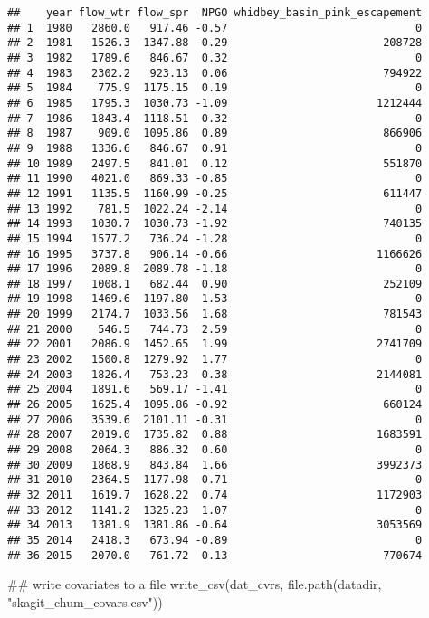 \documentclass[11pt,]{article}
\newenvironment{Shaded}{}{}
\newcommand{\KeywordTok}[1]{\textcolor[rgb]{0.00,0.00,1.00}{#1}}
\newcommand{\StringTok}[1]{\textcolor[rgb]{0.00,0.50,0.50}{#1}}
\newcommand{\NormalTok}[1]{#1}
\begin{document}
\begin{verbatim}
##    year flow_wtr flow_spr  NPGO whidbey_basin_pink_escapement
## 1  1980   2860.0   917.46 -0.57                             0
## 2  1981   1526.3  1347.88 -0.29                        208728
## 3  1982   1789.6   846.67  0.32                             0
## 4  1983   2302.2   923.13  0.06                        794922
## 5  1984    775.9  1175.15  0.19                             0
## 6  1985   1795.3  1030.73 -1.09                       1212444
## 7  1986   1843.4  1118.51  0.32                             0
## 8  1987    909.0  1095.86  0.89                        866906
## 9  1988   1336.6   846.67  0.91                             0
## 10 1989   2497.5   841.01  0.12                        551870
## 11 1990   4021.0   869.33 -0.85                             0
## 12 1991   1135.5  1160.99 -0.25                        611447
## 13 1992    781.5  1022.24 -2.14                             0
## 14 1993   1030.7  1030.73 -1.92                        740135
## 15 1994   1577.2   736.24 -1.28                             0
## 16 1995   3737.8   906.14 -0.66                       1166626
## 17 1996   2089.8  2089.78 -1.18                             0
## 18 1997   1008.1   682.44  0.90                        252109
## 19 1998   1469.6  1197.80  1.53                             0
## 20 1999   2174.7  1033.56  1.68                        781543
## 21 2000    546.5   744.73  2.59                             0
## 22 2001   2086.9  1452.65  1.99                       2741709
## 23 2002   1500.8  1279.92  1.77                             0
## 24 2003   1826.4   753.23  0.38                       2144081
## 25 2004   1891.6   569.17 -1.41                             0
## 26 2005   1625.4  1095.86 -0.92                        660124
## 27 2006   3539.6  2101.11 -0.31                             0
## 28 2007   2019.0  1735.82  0.88                       1683591
## 29 2008   2064.3   886.32  0.60                             0
## 30 2009   1868.9   843.84  1.66                       3992373
## 31 2010   2364.5  1177.98  0.71                             0
## 32 2011   1619.7  1628.22  0.74                       1172903
## 33 2012   1141.2  1325.23  1.07                             0
## 34 2013   1381.9  1381.86 -0.64                       3053569
## 35 2014   2418.3   673.94 -0.89                             0
## 36 2015   2070.0   761.72  0.13                        770674
\end{verbatim}

\begin{Shaded}
\begin{Highlighting}[]
\NormalTok{## write covariates to a file}
\KeywordTok{write_csv}\NormalTok{(dat_cvrs, }\KeywordTok{file.path}\NormalTok{(datadir, }\StringTok{"skagit_chum_covars.csv"}\NormalTok{))}
\end{Highlighting}
\end{Shaded}
\end{document}
